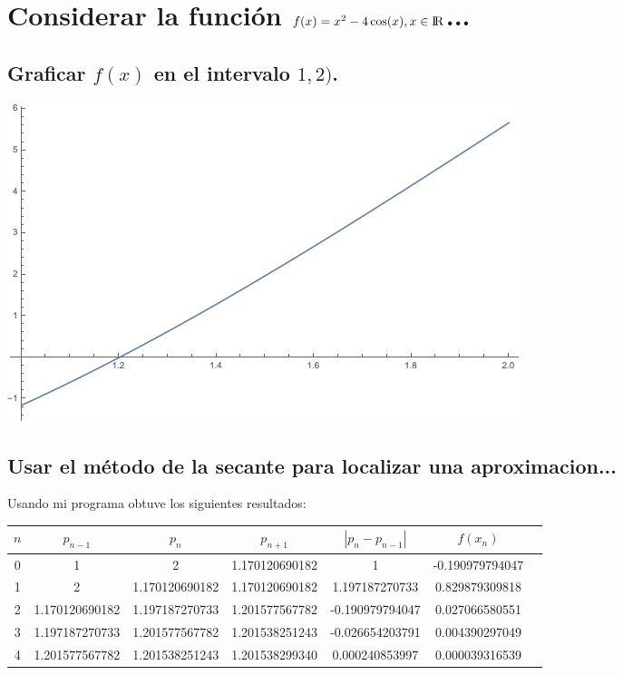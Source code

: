 \documentclass{article}
\begin{document}
\section{Considerar la función $f(x) = x^2-4\cos(x) , x \in {\rm I\!R}$...}
\subsection{Graficar $f(x)$ en el intervalo $1,2)$.}
\includegraphics[scale=0.75]{grafica.png}

\subsection{Usar el método de la secante para localizar una aproximacion...}
Usando mi programa obtuve los siguientes resultados:

\begin{center}
    \begin{tabular}{||c c c c c c c||} 
    \hline
    $n$ & $p_{n-1}$ & $p_{n}$  & $p_{n+1}$ & $|p_n - p_{n-1}|$ & $f(x_n)$\\ [0.5ex] 
    \hline\hline
    0 & 1 & 2 & 1.170120690182 & 1 & -0.190979794047 \\ 
    \hline
    1 & 2 & 1.170120690182 & 1.170120690182 & 1.197187270733 & 0.829879309818 \\
    \hline
    2 & 1.170120690182 & 1.197187270733 & 1.201577567782  & -0.190979794047 & 0.027066580551\\
    \hline
    3 & 1.197187270733 & 1.201577567782 & 1.201538251243 & -0.026654203791 & 0.004390297049\\
    \hline
    4 & 1.201577567782 & 1.201538251243 & 1.201538299340  & 0.000240853997 & 0.000039316539\\ [1ex]
    \hline

   \end{tabular}
\end{center}
\end{document}
